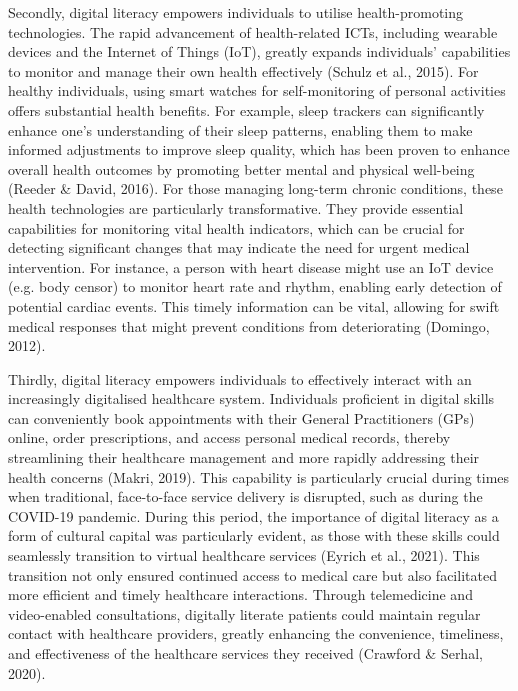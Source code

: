 Secondly, digital literacy empowers individuals to utilise health-promoting technologies. The rapid advancement of health-related ICTs, including wearable devices and the Internet of Things (IoT), greatly expands individuals' capabilities to monitor and manage their own health effectively (Schulz et al., 2015). For healthy individuals, using smart watches for self-monitoring of personal activities offers substantial health benefits. For example, sleep trackers can significantly enhance one's understanding of their sleep patterns, enabling them to make informed adjustments to improve sleep quality, which has been proven to enhance overall health outcomes by promoting better mental and physical well-being (Reeder \& David, 2016). For those managing long-term chronic conditions, these health technologies are particularly transformative. They provide essential capabilities for monitoring vital health indicators, which can be crucial for detecting significant changes that may indicate the need for urgent medical intervention. For instance, a person with heart disease might use an IoT device (e.g. body censor) to monitor heart rate and rhythm, enabling early detection of potential cardiac events. This timely information can be vital, allowing for swift medical responses that might prevent conditions from deteriorating (Domingo, 2012).

Thirdly, digital literacy empowers individuals to effectively interact with an increasingly digitalised healthcare system. Individuals proficient in digital skills can conveniently book appointments with their General Practitioners (GPs) online, order prescriptions, and access personal medical records, thereby streamlining their healthcare management and more rapidly addressing their health concerns (Makri, 2019). This capability is particularly crucial during times when traditional, face-to-face service delivery is disrupted, such as during the COVID-19 pandemic. During this period, the importance of digital literacy as a form of cultural capital was particularly evident, as those with these skills could seamlessly transition to virtual healthcare services (Eyrich et al., 2021). This transition not only ensured continued access to medical care but also facilitated more efficient and timely healthcare interactions. Through telemedicine and video-enabled consultations, digitally literate patients could maintain regular contact with healthcare providers, greatly enhancing the convenience, timeliness, and effectiveness of the healthcare services they received (Crawford \& Serhal, 2020).

